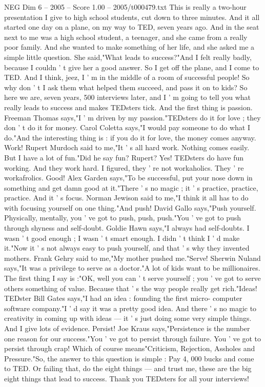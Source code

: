 \begin{textsample}{NEG Dim 6 – 2005 – Score 1.00 – 2005/t000479.txt}  \label{ex:f6_neg_076}
This is really a two-hour presentation I give to high school students, cut down to three minutes.
And it all started one day on a plane, on my way to TED, seven years ago.
And in the seat next to me was a high school student, a teenager, and she came from a really poor family.
And she wanted to make something of her life, and she asked me a simple little question.
She said,"What leads to success?"And I felt really badly, because I couldn ' t give her a good answer.
So I get off the plane, and I come to TED.
And I think, jeez, I ' m in the middle of a room of successful people!
So why don ' t I ask them what helped them succeed, and pass it on to kids?
So here we are, seven years, 500 interviews later, and I ' m going to tell you what really leads to success and makes TEDsters tick.
And the first thing is passion.
Freeman Thomas says,"I ' m driven by my passion."TEDsters do it for love ; they don ' t do it for money.
Carol Coletta says,"I would pay someone to do what I do."And the interesting thing is : if you do it for love, the money comes anyway.
Work!
Rupert Murdoch said to me,"It ' s all hard work.
Nothing comes easily.
But I have a lot of fun."Did he say fun?
Rupert?
Yes!
TEDsters do have fun working.
And they work hard.
I figured, they ' re not workaholics.
They ' re workafrolics.
Good!
Alex Garden says,"To be successful, put your nose down in something and get damn good at it."There ' s no magic ; it ' s practice, practice, practice.
And it ' s focus.
Norman Jewison said to me,"I think it all has to do with focusing yourself on one thing."And push!
David Gallo says,"Push yourself.
Physically, mentally, you ' ve got to push, push, push."You ' ve got to push through shyness and self-doubt.
Goldie Hawn says,"I always had self-doubts.
I wasn ' t good enough ; I wasn ' t smart enough.
I didn ' t think I ' d make it."Now it ' s not always easy to push yourself, and that ' s why they invented mothers.
Frank Gehry said to me,"My mother pushed me."Serve!
Sherwin Nuland says,"It was a privilege to serve as a doctor."A lot of kids want to be millionaires.
The first thing I say is :"OK, well you can ' t serve yourself ; you ' ve got to serve others something of value.
Because that ' s the way people really get rich."Ideas!
TEDster Bill Gates says,"I had an idea : founding the first micro- computer software company."I ' d say it was a pretty good idea.
And there ' s no magic to creativity in coming up with ideas — it ' s just doing some very simple things.
And I give lots of evidence.
Persist!
Joe Kraus says,"Persistence is the number one reason for our success."You ' ve got to persist through failure.
You ' ve got to persist through crap!
Which of course means"Criticism, Rejection, Assholes and Pressure."So, the answer to this question is simple : Pay 4, 000 bucks and come to TED.
Or failing that, do the eight things — and trust me, these are the big eight things that lead to success.
Thank you TEDsters for all your interviews!

\end{textsample}
